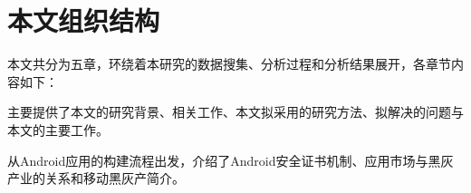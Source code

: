 %
%
%
%
\section{本文组织结构}
本文共分为五章，环绕着本研究的数据搜集、分析过程和分析结果展开，各章节内容如下：

 主要提供了本文的研究背景、相关工作、本文拟采用的研究方法、拟解决的问题与本文的主要工作。

 从Android应用的构建流程出发，介绍了Android安全证书机制、应用市场与黑灰产业的关系和移动黑灰产简介。


